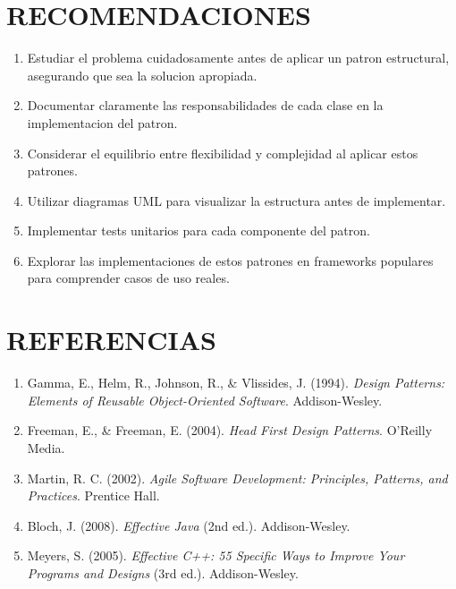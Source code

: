 \documentclass[11pt,a4paper]{article}
\begin{document}
\section{RECOMENDACIONES}

\begin{enumerate}
    \item Estudiar el problema cuidadosamente antes de aplicar un patron estructural, asegurando que sea la solucion apropiada.
    
    \item Documentar claramente las responsabilidades de cada clase en la implementacion del patron.
    
    \item Considerar el equilibrio entre flexibilidad y complejidad al aplicar estos patrones.
    
    \item Utilizar diagramas UML para visualizar la estructura antes de implementar.
    
    \item Implementar tests unitarios para cada componente del patron.
    
    \item Explorar las implementaciones de estos patrones en frameworks populares para comprender casos de uso reales.
\end{enumerate}

\section{REFERENCIAS}

\begin{enumerate}
    \item Gamma, E., Helm, R., Johnson, R., \& Vlissides, J. (1994). \textit{Design Patterns: Elements of Reusable Object-Oriented Software}. Addison-Wesley.
    
    \item Freeman, E., \& Freeman, E. (2004). \textit{Head First Design Patterns}. O'Reilly Media.
    
    \item Martin, R. C. (2002). \textit{Agile Software Development: Principles, Patterns, and Practices}. Prentice Hall.
    
    \item Bloch, J. (2008). \textit{Effective Java} (2nd ed.). Addison-Wesley.
    
    \item Meyers, S. (2005). \textit{Effective C++: 55 Specific Ways to Improve Your Programs and Designs} (3rd ed.). Addison-Wesley.
\end{enumerate}
\end{document}
